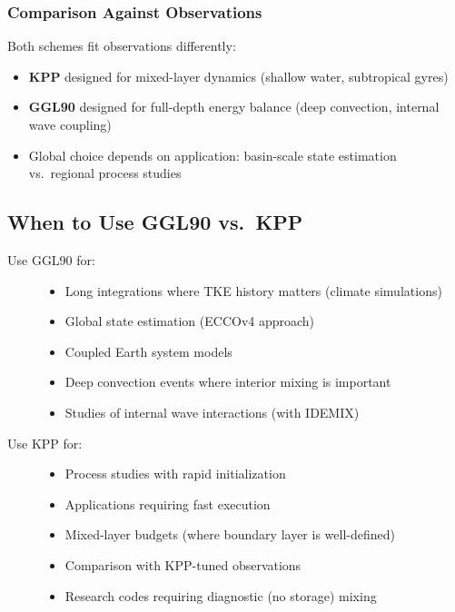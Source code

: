 \documentclass[11pt, a4paper]{article}
\begin{document}
\subsubsection{Comparison Against Observations}

Both schemes fit observations differently:

\begin{itemize}
    \item \textbf{KPP} designed for mixed-layer dynamics (shallow water, subtropical gyres)
    \item \textbf{GGL90} designed for full-depth energy balance (deep convection, internal wave coupling)
    \item Global choice depends on application: basin-scale state estimation vs.\ regional process studies
\end{itemize}

\subsection{When to Use GGL90 vs.\ KPP}

\begin{description}
    \item[Use GGL90 for:]
    \begin{itemize}
        \item Long integrations where TKE history matters (climate simulations)
        \item Global state estimation (ECCOv4 approach)
        \item Coupled Earth system models
        \item Deep convection events where interior mixing is important
        \item Studies of internal wave interactions (with IDEMIX)
    \end{itemize}
    
    \item[Use KPP for:]
    \begin{itemize}
        \item Process studies with rapid initialization
        \item Applications requiring fast execution
        \item Mixed-layer budgets (where boundary layer is well-defined)
        \item Comparison with KPP-tuned observations
        \item Research codes requiring diagnostic (no storage) mixing
    \end{itemize}
\end{description}
\end{document}
